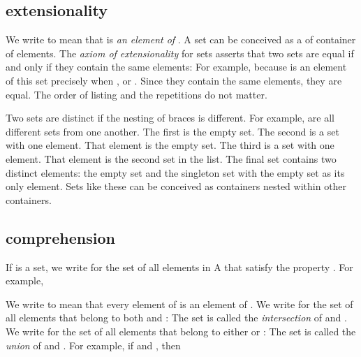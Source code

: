 \subsection{extensionality}

We write  to mean that  is {\it an element of} .  A set can be conceived as a of container of elements.  The {\it axiom of extensionality} for sets asserts that two sets are equal if and only if they contain the same elements:
For example,
because  is an element of this set precisely when , or .
Since they contain the same elements, they are equal.  The order of listing and the repetitions do not matter.

Two sets are distinct if the nesting of braces is different.
For example,
\mc{$$
\{\},\qquad \{\{\}\},\qquad \{\{\{\}\}\},\qquad \{\{\},\{\{\}\}\}
$$}
are all different sets from one another.  The first is the empty set.
The second is a set with one element.  That element is the empty set.
The third is a set with one element.  That element is the second set in the list.  The final set contains two distinct elements: the empty set and the singleton set with the empty set as its only element.  Sets like these can be conceived as containers nested within other containers.

\subsection{comprehension}

If  is a set, we write
for the set of all elements in A that satisfy the property .
For example,



We write  to mean that every element of  is an element of . We write  for the set of all elements that belong to both  and :
The set  is called the {\it intersection} of  and . We write  for the set of all elements that belong to either  or :
The set  is called the {\it union} of  and .
For example, if  and , then

